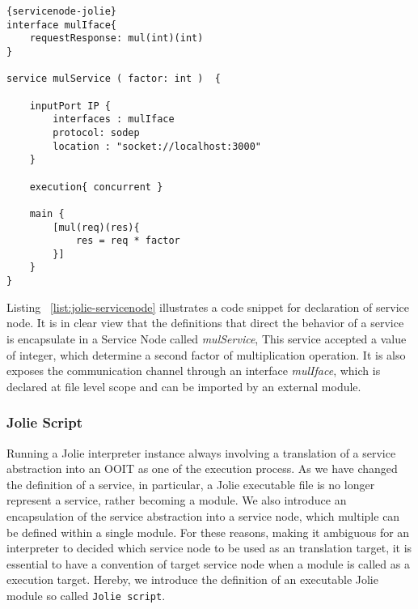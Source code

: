 \begin{listing}[h]

    \lstset{language=Jolie,
        style=codeStyle,
        numbers=left,
        firstnumber=1
    }
    \begin{lstlisting}[frame=tlrb, caption= {Jolie Service Node Example}, label={list:jolie-servicenode} ]{servicenode-jolie}
interface mulIface{
    requestResponse: mul(int)(int)
}

service mulService ( factor: int )  {
    
    inputPort IP {
        interfaces : mulIface
        protocol: sodep
        location : "socket://localhost:3000"
    }

    execution{ concurrent }

    main {
        [mul(req)(res){
            res = req * factor
        }]
    }
}
    \end{lstlisting}
\end{listing}

Listing ~\ref{list:jolie-servicenode} illustrates a code snippet for declaration of service node. It is in clear view that the definitions that direct the behavior of a service is encapsulate in a Service Node called \textit{mulService}, This service accepted a value of integer, which determine a second factor of multiplication operation. It is also exposes the communication channel through an interface \textit{mulIface}, which is declared at file level scope and can be imported by an external module.

\FloatBarrier

\subsubsection*{Jolie Script}

Running a Jolie interpreter instance always involving a translation of a service abstraction into an OOIT as one of the execution process.
As we have changed the definition of a service, in particular, a Jolie executable file is no longer represent a service, rather becoming a module.   
We also introduce an encapsulation of the service abstraction into a service node, which multiple can be defined within a single module.
For these reasons, making it ambiguous for an interpreter to decided which service node to be used as an translation target, it is essential to have a convention of target service node when a module is called as a execution target.
Hereby, we introduce the definition of an executable Jolie module so called \texttt{Jolie script}.


